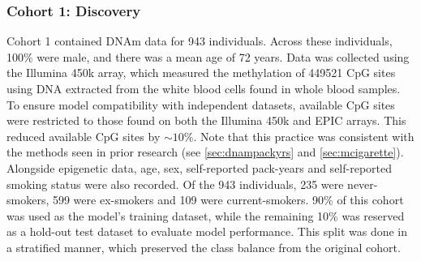 \documentclass{article} %
\begin{document}
\subsubsection{Cohort 1: Discovery}
Cohort 1 contained DNAm data for 943 individuals. Across these individuals, 100\% were male, and there was a mean age of 72 years. Data was collected using the Illumina 450k array, which measured the methylation of \num{449521} CpG sites using DNA extracted from the white blood cells found in whole blood samples. To ensure model compatibility with independent datasets, available CpG sites were restricted to those found on both the Illumina 450k and EPIC arrays. This reduced available CpG sites by \(\sim\!10\%\). Note that this practice was consistent with the methods seen in prior research (see \ref{sec:dnampackyrs} and \ref{sec:mcigarette}). Alongside epigenetic data, age, sex, self-reported pack-years and self-reported smoking status were also recorded. Of the 943 individuals, 235 were never-smokers, 599 were ex-smokers and 109 were current-smokers. 90\% of this cohort was used as the model's training dataset, while the remaining 10\% was reserved as a hold-out test dataset to evaluate model performance. This split was done in a stratified manner, which preserved the class balance from the original cohort.

\end{document}
